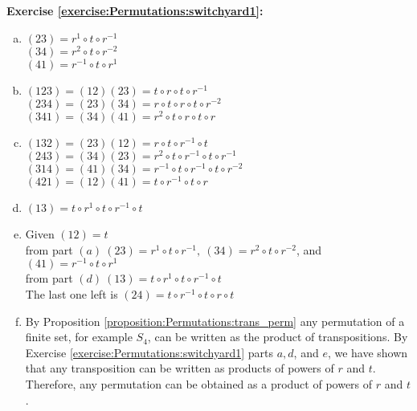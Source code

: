 \noindent\textbf{Exercise \ref{exercise:Permutations:switchyard1}:} %
\begin{enumerate}[(a)]
\item
$(23)=r^{1}\circ t\circ r^{-1}$ \\
$(34)=r^{2}\circ t\circ r^{-2}$ \\
$(41)=r^{-1}\circ t\circ r^{1}$ 

\item
$(123)=(12)(23)=t\circ r\circ t\circ r^{-1}$ \\
$(234)=(23)(34)=r\circ t\circ r\circ t\circ r^{-2}$ \\
$(341)=(34)(41)=r^{2}\circ t\circ r\circ t\circ r$ 

\item
$(132)=(23)(12)=r\circ t\circ r^{-1}\circ t$ \\
$(243)=(34)(23)=r^{2}\circ t\circ r^{-1}\circ t\circ r^{-1}$ \\
$(314)=(41)(34)=r^{-1}\circ t\circ r^{-1}\circ t\circ r^{-2}$ \\
$(421)=(12)(41)=t\circ r^{-1}\circ t\circ r$ 

\item
$(13)=t\circ r^{1}\circ t\circ r^{-1}\circ t$

\item
Given $(12)=t$\\
from part $(a)\ (23) = r^{1}\circ t\circ r^{-1},\ (34) = r^{2}\circ t\circ r^{-2}$, and $(41) = r^{-1}\circ t\circ r^{1}$\\
from part $(d)\ (13) = t\circ r^{1}\circ t\circ r^{-1}\circ t$\\
The last one left is $(24) = t\circ r^{-1}\circ t\circ r\circ t$

\item
By Proposition \ref{proposition:Permutations:trans_perm} any permutation of a finite set, for example $S_4$, can be written as the product of transpositions.  By Exercise \ref{exercise:Permutations:switchyard1} parts $a, d$, and $e$, we have shown that any transposition can be written as products of powers of $r$ and $t$.  Therefore, any permutation can be obtained as a product of powers of $r$ and $t$.
\end{enumerate}

